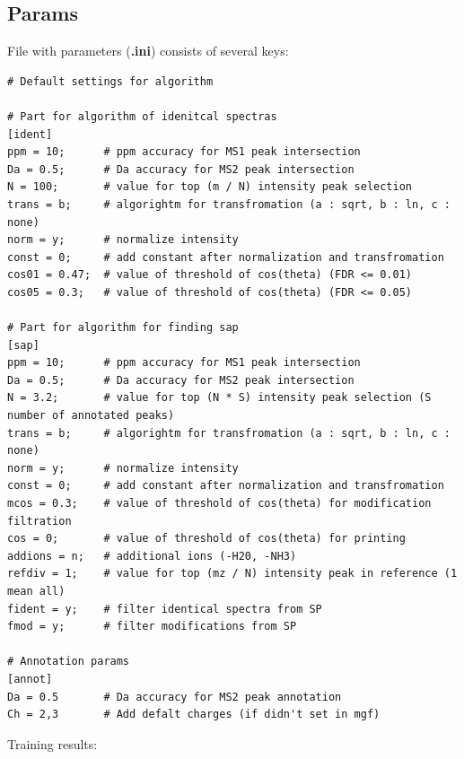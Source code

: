\documentclass{article}
\begin{document}
\clearpage
\subsection{Params}
\par

File with parameters (\textbf{.ini}) consists of several keys:
\begin{lstlisting}
# Default settings for algorithm

# Part for algorithm of idenitcal spectras
[ident]
ppm = 10;      # ppm accuracy for MS1 peak intersection
Da = 0.5;      # Da accuracy for MS2 peak intersection
N = 100;       # value for top (m / N) intensity peak selection
trans = b;     # algorightm for transfromation (a : sqrt, b : ln, c : none)
norm = y;      # normalize intensity
const = 0;     # add constant after normalization and transfromation 
cos01 = 0.47;  # value of threshold of cos(theta) (FDR <= 0.01)
cos05 = 0.3;   # value of threshold of cos(theta) (FDR <= 0.05)

# Part for algorithm for finding sap
[sap]
ppm = 10;      # ppm accuracy for MS1 peak intersection
Da = 0.5;      # Da accuracy for MS2 peak intersection
N = 3.2;       # value for top (N * S) intensity peak selection (S number of annotated peaks)
trans = b;     # algorightm for transfromation (a : sqrt, b : ln, c : none)
norm = y;      # normalize intensity
const = 0;     # add constant after normalization and transfromation
mcos = 0.3;    # value of threshold of cos(theta) for modification filtration
cos = 0;       # value of threshold of cos(theta) for printing
addions = n;   # additional ions (-H20, -NH3)
refdiv = 1;    # value for top (mz / N) intensity peak in reference (1 mean all)
fident = y;    # filter identical spectra from SP
fmod = y;      # filter modifications from SP

# Annotation params
[annot]
Da = 0.5       # Da accuracy for MS2 peak annotation
Ch = 2,3       # Add defalt charges (if didn't set in mgf)

\end{lstlisting}
\clearpage
\par
Training results:
\end{document}

